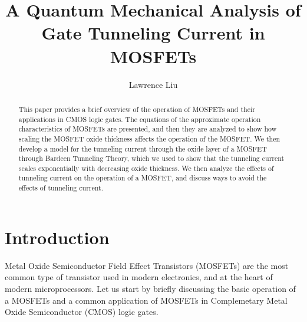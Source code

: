 \documentclass[
  reprint,
  amsmath,amssymb,
  aps
]{revtex4-1}
\begin{document}
\title{A Quantum Mechanical Analysis of Gate Tunneling Current in MOSFETs}%



\author{Lawrence Liu}


\begin{abstract}
    This paper provides a brief overview of the operation of MOSFETs and their applications in CMOS logic gates. The 
    equations of the approximate operation characteristics of MOSFETs are presented, and then they are analyzed to 
    show how scaling the MOSFET oxide thickness affects the operation of the MOSFET. We then develop a model for the 
    tunneling current through the oxide layer of a MOSFET through Bardeen Tunneling Theory, which we used to show that the tunneling 
    current scales exponentially with decreasing oxide thickness. We then analyze the effects of tunneling current on the 
    operation of a MOSFET, and discuss ways to avoid the effects of tunneling current.
\end{abstract}

\maketitle
{}


\section{\label{sec:level1}Introduction}
Metal Oxide Semiconductor Field Effect Transistors (MOSFETs) are the most common type of transistor used in modern electronics, and 
at the heart of modern microprocessors. Let us start 
by briefly discussing the basic operation of a MOSFETs and a common application of MOSFETs in Complemetary Metal Oxide Semiconductor (CMOS) logic gates.
\end{document}
